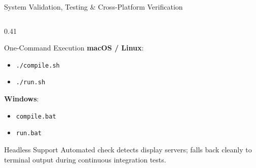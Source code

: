 \documentclass[aspectratio=169,10pt]{beamer}
\begin{document}
\begin{frame}{System Validation, Testing \& Cross-Platform Verification}
\begin{columns}[T]
        \begin{column}{0.41\textwidth}
            \begin{exampleblock}{One-Command Execution}
                \small
                \textbf{macOS / Linux}:
                \begin{itemize}
                    \item \texttt{./compile.sh}
                    \item \texttt{./run.sh}
                \end{itemize}
                \vspace{0.2cm}
                \textbf{Windows}:
                \begin{itemize}
                    \item \texttt{compile.bat}
                    \item \texttt{run.bat}
                \end{itemize}
            \end{exampleblock}
            \vspace{0.2cm}
            \begin{alertblock}{Headless Support}
                \scriptsize Automated check detects display servers; falls back cleanly to terminal output during continuous integration tests.
            \end{alertblock}
        \end{column}
    \end{columns}
\end{frame}
\end{document}
